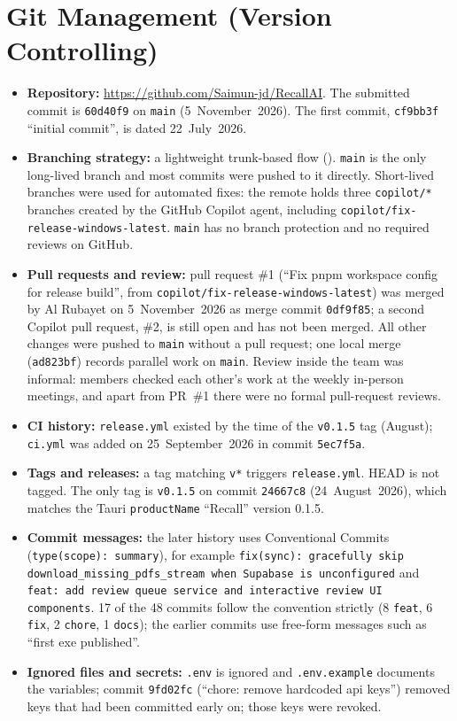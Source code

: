 \section{Git Management (Version Controlling)}\label{sec:git}

\begin{itemize}[leftmargin=*]
  \item \textbf{Repository:} \url{https://github.com/Saimun-jd/RecallAI}. The submitted
    commit is \texttt{60d40f9} on \texttt{main} (5~November~2026). The first commit,
    \texttt{cf9bb3f} ``initial commit'', is dated 22~July~2026.
  \item \textbf{Branching strategy:} a lightweight trunk-based flow
    (). \texttt{main} is the only long-lived branch and most
    commits were pushed to it directly. Short-lived branches were used for automated
    fixes: the remote holds three \texttt{copilot/*} branches created by the GitHub
    Copilot agent, including \texttt{copilot/fix-release-windows-latest}. \texttt{main}
    has no branch protection and no required reviews on GitHub.
  \item \textbf{Pull requests and review:} pull request \#1 (``Fix pnpm workspace config
    for release build'', from \texttt{copilot/fix-release-windows-latest}) was merged by
    Al Rubayet on 5~November~2026 as merge commit \texttt{0df9f85}; a second Copilot pull
    request, \#2, is still open and has not been merged. All other changes
    were pushed to \texttt{main} without a pull request; one local merge
    (\texttt{ad823bf}) records parallel work on \texttt{main}. Review inside the team
    was informal: members checked each other's work at the weekly in-person meetings, and
    apart from PR~\#1 there were no formal pull-request reviews.
  \item \textbf{CI history:} \texttt{release.yml} existed by the time of the
    \texttt{v0.1.5} tag (August); \texttt{ci.yml} was added on 25~September~2026 in
    commit \texttt{5ec7f5a}.
  \item \textbf{Tags and releases:} a tag matching \texttt{v*} triggers
    \texttt{release.yml}. HEAD is not tagged. The only tag is \texttt{v0.1.5} on commit \texttt{24667c8}
    (24~August~2026), which matches the Tauri \texttt{productName} ``Recall'' version
    0.1.5.
  \item \textbf{Commit messages:} the later history uses Conventional Commits
    (\texttt{type(scope): summary}), for example \texttt{fix(sync): gracefully skip
    download\_missing\_pdfs\_stream when Supabase is unconfigured} and
    \texttt{feat: add review queue service and interactive review UI components}.
    17 of the 48 commits follow the convention strictly (8 \texttt{feat}, 6 \texttt{fix},
    2 \texttt{chore}, 1 \texttt{docs}); the earlier commits use free-form messages such as
    ``first exe published''.
  \item \textbf{Ignored files and secrets:} \texttt{.env} is ignored and
    \texttt{.env.example} documents the variables; commit \texttt{9fd02fc}
    (``chore: remove hardcoded api keys'') removed keys that had been committed early
    on; those keys were revoked.
\end{itemize}


